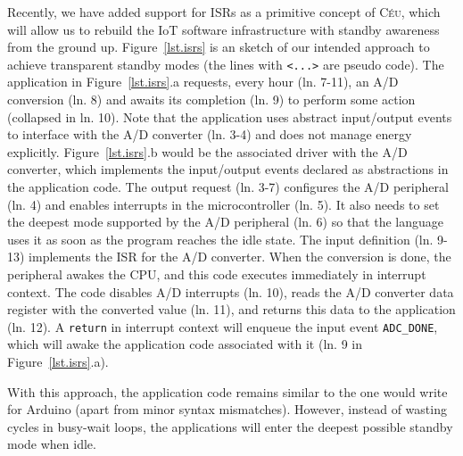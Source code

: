 \documentclass[12pt,english]{amsart}
\newcommand{\CEU}{\textsc{C\'{e}u}\xspace}
\newcommand{\code}[1] {{\small{\texttt{#1}}}}
\begin{document}
Recently, we have added support for ISRs as a primitive concept of
\CEU, which will allow us to rebuild the IoT software infrastructure with
standby awareness from the ground up.
%
Figure~\ref{lst.isrs} is an sketch of our intended approach to achieve transparent
standby modes (the lines with \code{<...>} are pseudo code).
%
The application in Figure~\ref{lst.isrs}.a requests, every hour (ln. 7-11), an
A/D conversion (ln. 8) and awaits its completion (ln. 9) to perform some action
(collapsed in ln. 10).
%
Note that the application uses abstract input/output events to interface with
the A/D converter (ln. 3-4) and does not manage energy explicitly.
%
Figure~\ref{lst.isrs}.b would be the associated driver with the A/D converter,
which implements the input/output events declared as abstractions in the
application code.
The output request (ln. 3-7) configures the A/D peripheral (ln. 4) and enables
interrupts in the microcontroller (ln. 5).
It also needs to set the deepest mode supported by the A/D peripheral (ln. 6)
so that the language uses it as soon as the program reaches the idle state.
The input definition (ln. 9-13) implements the ISR for the A/D converter.
When the conversion is done, the peripheral awakes the CPU, and this code
executes immediately in interrupt context.
The code disables A/D interrupts (ln. 10), reads the A/D converter data
register with the converted value (ln. 11), and returns this data to the
application (ln. 12).
A \code{return} in interrupt context will enqueue the input event
\code{ADC\_DONE}, which will awake the application code associated with it
(ln. 9 in Figure~\ref{lst.isrs}.a).

With this approach, the application code remains similar to the one would write
for Arduino (apart from minor syntax mismatches).
However, instead of wasting cycles in busy-wait loops, the applications will
enter the deepest possible standby mode when idle.
\end{document}
